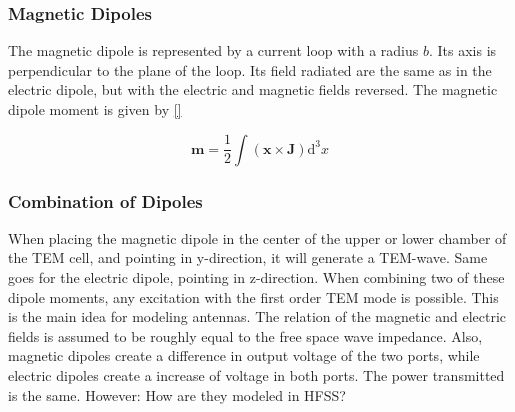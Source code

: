 \subsubsection{Magnetic Dipoles}

The magnetic dipole is represented by a current loop with a radius $b$. Its axis is perpendicular to the plane of the loop. Its field radiated are the same as in the electric dipole, but with the electric and magnetic fields reversed\cite{Balanis_1997}. The magnetic dipole moment is given by \autoref{}

\begin{equation}
    \mathbf{m}=\frac{1}{2}\int (\mathbf{x} \times \mathbf{J})\mathrm{d}^3x
\end{equation}


\subsubsection{Combination of Dipoles}

When placing the magnetic dipole in the center of the upper or lower chamber of the TEM cell, and pointing in y-direction, it will generate a TEM-wave. Same goes for the electric dipole, pointing in z-direction. When combining two of these dipole moments, any excitation with the first order TEM mode is possible. This is the main idea for modeling antennas. The relation of the magnetic and electric fields is assumed to be roughly equal to the free space wave impedance. Also, magnetic dipoles create a difference in output voltage of the two ports, while electric dipoles create a increase of voltage in both ports. The power transmitted is the same. However: How are they modeled in HFSS? 
